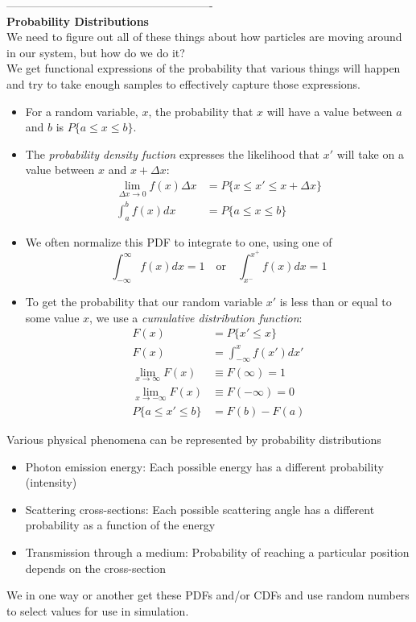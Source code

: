 \documentclass[12pt]{article}
\begin{document}
-------------------------------------------------------\\
\textbf{Probability Distributions}\\
We need to figure out all of these things about how particles are moving around in our system, but how do we do it?\\
We get functional expressions of the probability that various things will happen and try to take enough samples to effectively capture those expressions.
%
\begin{itemize}
\item For a random variable, $x$, the probability that $x$ will have a value between $a$ and $b$ is $P\{a \leq x \leq b\}$.
%
\item The \textit{probability density fuction} expresses the likelihood that $x'$ will take on a value between $x$ and $x+\Delta x$:
\begin{align*}
\lim_{\Delta x \to 0} f(x)\Delta x &= P \{ x \leq x' \leq x + \Delta x \}\\
\int_a^b f(x) dx &= P\{a \leq x \leq b\}
\end{align*}
%
\item We often normalize this PDF to integrate to one, using one of
\begin{equation}
\int_{-\infty}^{\infty} f(x) dx = 1 \quad \text{or} \quad
\int_{x^-}^{x^+} f(x) dx = 1 \nonumber
\end{equation}
%
\item To get the probability that our random variable $x'$ is less than or equal to some value $x$, we use a \textit{cumulative distribution function}:
\begin{align*}
F(x) &= P\{x' \leq x\} \\
F(x) &= \int_{-\infty}^{x} f(x') dx' \\
\lim_{x \to \infty} F(x) &\equiv F(\infty) = 1 \\
\lim_{x \to -\infty} F(x) &\equiv F(-\infty) = 0 \\
P \{ a \leq x' \leq b \} &= F(b) - F(a)
\end{align*}
\end{itemize}

Various physical phenomena can be represented by probability distributions
\begin{itemize}
  \item Photon emission energy: Each possible energy has a different probability (intensity)
  \item Scattering cross-sections: Each possible scattering angle has a different probability as a function of the energy
  \item Transmission through a medium: Probability of reaching a particular position
depends on the cross-section
\end{itemize}
%
We in one way or another get these PDFs and/or CDFs and use random numbers to select values for use in simulation.
\end{document}
